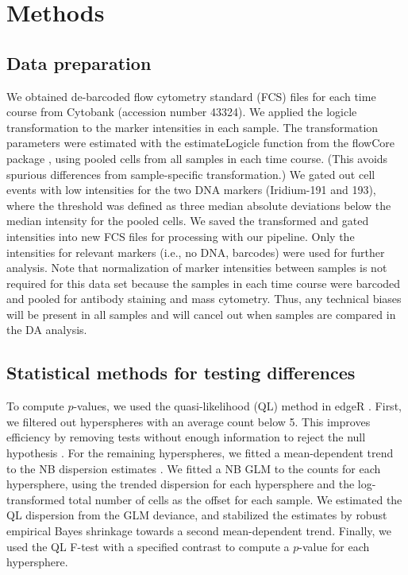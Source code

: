 \documentclass{article}
\begin{document}

\section{Methods}

\subsection{Data preparation}
We obtained de-barcoded flow cytometry standard (FCS) files for each time course from Cytobank \cite{kotecha2010web} (accession number 43324).
We applied the logicle transformation \cite{parks2006new} to the marker intensities in each sample.
The transformation parameters were estimated with the estimateLogicle function from the flowCore package \cite{hahne2009flowcore}, using pooled cells from all samples in each time course.
(This avoids spurious differences from sample-specific transformation.)
We gated out cell events with low intensities for the two DNA markers (Iridium-191 and 193), where the threshold was defined as three median absolute deviations below the median intensity for the pooled cells.
We saved the transformed and gated intensities into new FCS files for processing with our pipeline.
Only the intensities for relevant markers (i.e., no DNA, barcodes) were used for further analysis.
Note that normalization of marker intensities between samples is not required for this data set because the samples in each time course were barcoded and pooled for antibody staining and mass cytometry.
Thus, any technical biases will be present in all samples and will cancel out when samples are compared in the DA analysis.

\subsection{Statistical methods for testing differences}
To compute $p$-values, we used the quasi-likelihood (QL) method in edgeR \cite{lund2012detecting}.
First, we filtered out hyperspheres with an average count below 5.
This improves efficiency by removing tests without enough information to reject the null hypothesis \cite{bourgon2010independent}.
For the remaining hyperspheres, we fitted a mean-dependent trend to the NB dispersion estimates \cite{mccarthy2012differential}.
We fitted a NB GLM to the counts for each hypersphere, using the trended dispersion for each hypersphere and the log-transformed total number of cells as the offset for each sample.
We estimated the QL dispersion from the GLM deviance, and stabilized the estimates by robust empirical Bayes shrinkage \cite{phipson2016robust} towards a second mean-dependent trend.
Finally, we used the QL F-test with a specified contrast to compute a $p$-value for each hypersphere.
\end{document}
